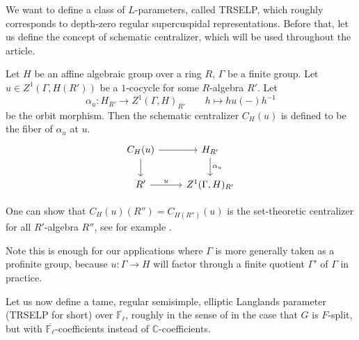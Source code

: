 	We want to define a class of $L$-parameters, called TRSELP, which roughly corresponds to depth-zero regular supercuspidal representations. Before that, let us define the concept of schematic centralizer, which will be used throughout the article.
	
	\begin{definition}\label{Definition: Schematic centralizer}
	Let $H$ be an affine algebraic group over a ring $R$, $\Gamma$ be a finite group. Let $u \in Z^1(\Gamma, H(R'))$ be a $1$-cocycle for some $R$-algebra $R'$. Let 
	$$\alpha_u: H_{R'} \longrightarrow Z^1(\Gamma, H)_{R'}\qquad h \longmapsto hu(-)h^{-1}$$
	 be the orbit morphism. Then the schematic centralizer $C_H(u)$ is defined to be the fiber of $\alpha_u$ at $u$.
	$$	
	\begin{tikzcd}
		{C_H(u)} \arrow[r, ""] \arrow[d, ""] & {H_{R'}} \arrow[d, "{\alpha_u}"] \\
		{R'} \arrow[r, "u"]                & {Z^1(\Gamma, H)_{R'}}               
	\end{tikzcd}
	$$	
	\end{definition}
	
	One can show that $C_H(u)(R'')=C_{H(R'')}(u)$ is the set-theoretic centralizer for all $R'$-algebra $R''$, see for example \cite[Appendix A]{dhkm2020moduli}.
	
	\begin{remark}
			Note this is enough for our applications where $\Gamma$ is more generally taken as a profinite group, because $u: \Gamma \to H$ will factor through a finite quotient $\Gamma'$ of $\Gamma$ in practice.
	\end{remark}
	
	Let us now define a tame, regular semisimple, elliptic Langlands parameter (TRSELP for short) over $\overline{\mathbb{F}_{\ell}}$, roughly in the sense of \cite[Section 3.4 and Section 4.1]{debacker2009depth} in the case that $G$ is $F$-split, but with $\overline{\mathbb{F}_{\ell}}$-coefficients instead of $\mathbb{C}$-coefficients.
	
